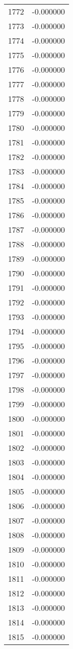 \documentclass[12pt]{article}
\begin{document}
\begin{longtable}{@{}cc@{}}
1772 & -0.000000 \\
1773 & -0.000000 \\
1774 & -0.000000 \\
1775 & -0.000000 \\
1776 & -0.000000 \\
1777 & -0.000000 \\
1778 & -0.000000 \\
1779 & -0.000000 \\
1780 & -0.000000 \\
1781 & -0.000000 \\
1782 & -0.000000 \\
1783 & -0.000000 \\
1784 & -0.000000 \\
1785 & -0.000000 \\
1786 & -0.000000 \\
1787 & -0.000000 \\
1788 & -0.000000 \\
1789 & -0.000000 \\
1790 & -0.000000 \\
1791 & -0.000000 \\
1792 & -0.000000 \\
1793 & -0.000000 \\
1794 & -0.000000 \\
1795 & -0.000000 \\
1796 & -0.000000 \\
1797 & -0.000000 \\
1798 & -0.000000 \\
1799 & -0.000000 \\
1800 & -0.000000 \\
1801 & -0.000000 \\
1802 & -0.000000 \\
1803 & -0.000000 \\
1804 & -0.000000 \\
1805 & -0.000000 \\
1806 & -0.000000 \\
1807 & -0.000000 \\
1808 & -0.000000 \\
1809 & -0.000000 \\
1810 & -0.000000 \\
1811 & -0.000000 \\
1812 & -0.000000 \\
1813 & -0.000000 \\
1814 & -0.000000 \\
1815 & -0.000000 \\

\end{longtable}
\end{document}
